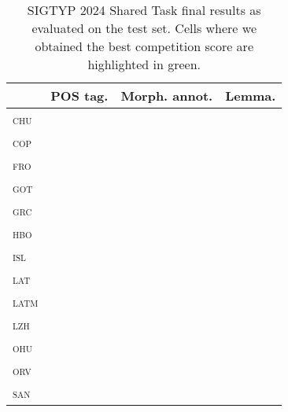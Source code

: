 \documentclass{../acl_latex.tex}
\begin{document}
\begin{table}[t]
\centering
\begin{tabular}{lccc}
\toprule
                 & POS tag. & Morph. annot. & Lemma. \\ \midrule
\textsc{chu}     & \cellcolor{green!25}         &               &        \\ 
\textsc{cop}     &          &               &        \\ 
\textsc{fro}     &          &               &        \\
\textsc{got}     &          &               &        \\
\textsc{grc}     &          &               &        \\
\textsc{hbo}     &          &               &        \\
\textsc{isl}     &          &               &        \\
\textsc{lat}     &          &               &        \\
\textsc{latm}    &          &               &        \\
\textsc{lzh}     &          &               &        \\
\textsc{ohu}     &          &               &        \\
\textsc{orv}     &          &               &        \\
\textsc{san}     &          &               &        \\ \bottomrule 
\end{tabular}
\caption{
    SIGTYP 2024 Shared Task final results as evaluated on the test set.
    Cells where we obtained the best competition score are highlighted in \colorbox{green!25}{green}.
}
\label{table:main_results}
\end{table}
\end{document}
